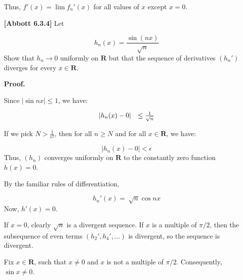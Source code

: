 \documentclass[10pt]{article}
\begin{document}
Thus, $\displaystyle f'( x) =\lim f_{n} '( x)$ for all values of $\displaystyle x$ except $\displaystyle x=0$. 



\textbf{[Abbott 6.3.4]} Let


\begin{equation*}
h_{n}( x) =\frac{\sin( nx)}{\sqrt{n}}
\end{equation*}
Show that $\displaystyle h_{n}\rightarrow 0$ uniformly on $\displaystyle \mathbf{R}$ but that the sequence of derivatives $\displaystyle ( h_{n} ')$ diverges for every $\displaystyle x\in \mathbf{R}$. 



\textbf{Proof.}



Since $\displaystyle |\sin nx|\leq 1$, we have:


\begin{equation*}
\begin{array}{ c c }
|h_{n}( x) -0| & \leq \frac{1}{\sqrt{n}}
\end{array}
\end{equation*}


If we pick $\displaystyle N >\frac{1}{\epsilon ^{2}}$, then for all $\displaystyle n\geq N$ and for all $\displaystyle x\in \mathbf{R}$, we have:


\begin{equation*}
|h_{n}( x) -0|< \epsilon 
\end{equation*}
Thus, $\displaystyle ( h_{n})$ converges uniformly on $\displaystyle \mathbf{R}$ to the constantly zero function $\displaystyle h( x) =0$.



By the familiar rules of differentiation,


\begin{equation*}
h_{n} '( x) =\ \sqrt{n}\cos nx
\end{equation*}
Now, $\displaystyle h'( x) =0$.



If $\displaystyle x=0$, clearly $\displaystyle \sqrt{n}$ is a divergent sequence. If $\displaystyle x$ is a multiple of $\displaystyle \pi /2$, then the subsequence of even terms $\displaystyle ( h_{2} ',h_{4} ',\dotsc )$ is divergent, so the sequence is divergent.



Fix $\displaystyle x\in \mathbf{R}$, such that $\displaystyle x\neq 0$ and $\displaystyle x$ is not a multiple of $\displaystyle \pi /2$. Consequently, $\displaystyle \sin x\neq 0$. 
\end{document}
